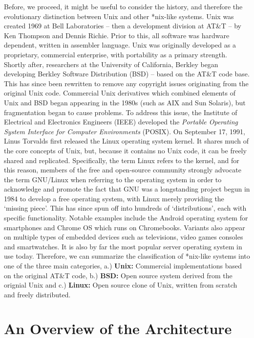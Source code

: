 \documentclass[11pt]{article}
\begin{document}
Before, we proceed, it might be useful to consider the history, and therefore the evolutionary distinction between Unix and other *nix-like systems. Unix was created 1969 at Bell Laboratories -- then a development division at AT\&T -- by Ken Thompson and Dennis Richie. Prior to this, all software was hardware dependent, written in assembler language. Unix was originally developed as a proprietary, commercial enterprise, with portability as a primary strength. Shortly after, researchers at the University of California, Berkley began developing Berkley Software Distribution (BSD) -- based on the AT\&T code base. This has since been rewritten to remove any copyright issues originating from the original Unix code. Commercial Unix derivatives which combined elements of Unix and BSD began appearing in the 1980s (such as AIX and Sun Solaris), but fragmentation began to cause problems. To address this issue, the Institute of Electrical and Electronics Engineers (IEEE) developed the \emph{Portable Operating System Interface for Computer Environments} (POSIX). On September 17, 1991, Linus Torvalds first released the Linux operating system kernel. It shares much of the core concepts of Unix, but, because it contains no Unix code, it can be freely shared and replicated. Specifically, the term Linux refers to the kernel, and for this reason, members of the free and open-source community strongly advocate the term GNU/Linux when referring to the operating system in order to acknowledge and promote the fact that GNU was a longstanding project begun in 1984 to develop a free operating system, with Linux merely providing the `missing piece'. This has since spun off into hundreds of `distributions', each with specific functionality. Notable examples include the Android operating system for smartphones and Chrome OS which runs on Chromebooks. Variants also appear on multiple types of embedded devices such as televisions, video games consoles and smartwatches. It is also by far the most popular server operating system in use today. Therefore, we can summarize the classification of *nix-like systems into one of the three main categories, a.) \textbf{Unix:} Commercial implementations based on the original AT\&T code, b.) \textbf{BSD:} Open source system derived from the orignial Unix and c.) \textbf{Linux:} Open source clone of Unix, written from scratch and freely distributed.

\section{An Overview of the Architecture}
\end{document}
